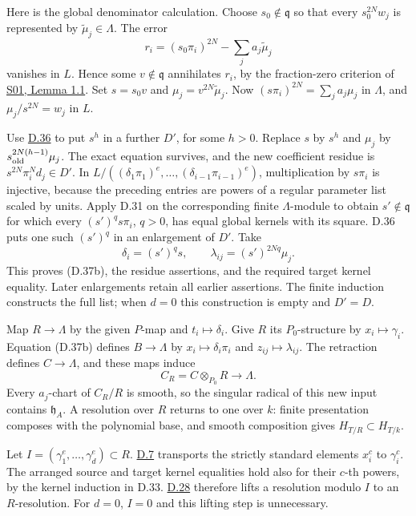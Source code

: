 \documentclass[11pt,a4paper,openany]{report}
\begin{document}
Here is the global denominator calculation. Choose \(s_0\notin\mathfrak q\) so that every \(s_0^{2N}w_j\) is represented by \(\widetilde\mu_j\in\Lambda\). The error \[
r_i=(s_0\pi_i)^{2N}-\sum_j a_j\widetilde\mu_j
\] vanishes in \(L\). Hence some \(v\notin\mathfrak q\) annihilates \(r_i\), by the fraction-zero criterion of \href{https://github.com/KokunoYumeto/open-math-courses/blob/main/docs/courses/AG-RG/AG-RG-S01.md}{S01, Lemma 1.1}. Set \(s=s_0v\) and \(\mu_j=v^{2N}\widetilde\mu_j\). Now \((s\pi_i)^{2N}=\sum_j a_j\mu_j\) in \(\Lambda\), and \(\mu_j/s^{2N}=w_j\) in \(L\).

Use \hyperref[AG-RG-S05-smoothing-lemma-enlarge-solution-modulo]{D.36} to put \(s^h\) in a further \(D'\), for some \(h>0\). Replace \(s\) by \(s^h\) and \(\mu_j\) by \(s_{\rm old}^{2N(h-1)}\mu_j\). The exact equation survives, and the new coefficient residue is \(s^{2N}\pi_i^Nd_j\in D'\). In \(L/((\delta_1\pi_1)^e,\ldots,(\delta_{i-1}\pi_{i-1})^e)\), multiplication by \(s\pi_i\) is injective, because the preceding entries are powers of a regular parameter list scaled by units. Apply D.31 on the corresponding finite \(\Lambda\)-module to obtain \(s'\notin\mathfrak q\) for which every \((s')^q s\pi_i\), \(q>0\), has equal global kernels with its square. D.36 puts one such \((s')^q\) in an enlargement of \(D'\). Take \[
\delta_i=(s')^qs,\qquad \lambda_{ij}=(s')^{2Nq}\mu_j.
\] This proves (D.37b), the residue assertions, and the required target kernel equality. Later enlargements retain all earlier assertions. The finite induction constructs the full list; when \(d=0\) this construction is empty and \(D'=D\).

Map \(R\to\Lambda\) by the given \(P\)-map and \(t_i\mapsto\delta_i\). Give \(R\) its \(P_0\)-structure by \(x_i\mapsto\gamma_i\). Equation (D.37b) defines \(B\to\Lambda\) by \(x_i\mapsto\delta_i\pi_i\) and \(z_{ij}\mapsto\lambda_{ij}\). The retraction defines \(C\to\Lambda\), and these maps induce \[
C_R=C\otimes_{P_0}R\longrightarrow\Lambda.
\] Every \(a_j\)-chart of \(C_R/R\) is smooth, so the singular radical of this new input contains \(\mathfrak h_A\). A resolution over \(R\) returns to one over \(k\): finite presentation composes with the polynomial base, and smooth composition gives \(H_{T/R}\subset H_{T/k}\).

Let \(I=(\gamma_1^e,\ldots,\gamma_d^e)\subset R\). \hyperref[AG-RG-S05-smoothing-lemma-strictly-standard-base-change]{D.7} transports the strictly standard elements \(x_i^c\) to \(\gamma_i^c\). The arranged source and target kernel equalities hold also for their \(c\)-th powers, by the kernel induction in D.33. \hyperref[AG-RG-S05-smoothing-lemma-lift-solution]{D.28} therefore lifts a resolution modulo \(I\) to an \(R\)-resolution. For \(d=0\), \(I=0\) and this lifting step is unnecessary.
\end{document}
